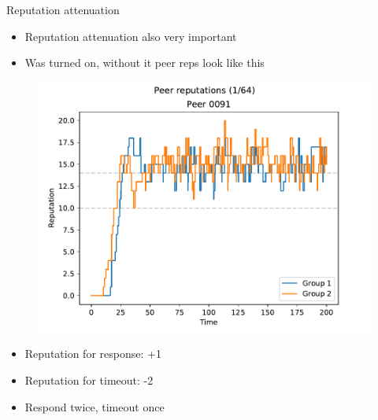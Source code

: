 \documentclass[presentation,english,usenames,dvipsnames]{beamer}
\begin{document}
\begin{frame}{Reputation attenuation}
  \begin{itemize}
    \item Reputation attenuation also very important
    \item Was turned on, without it peer reps look like this
  \end{itemize}

  \pause

  \begin{minipage}{0.5\textwidth}
    \begin{figure}
      \centering
      \includegraphics[width=1\textwidth]{figures/attenuation_no_attenuation_peer_reps_1_of_64}
    \end{figure}
  \end{minipage}%
  \begin{minipage}{0.5\textwidth}
    \begin{itemize}
      \item Reputation for response: +1
      \item Reputation for timeout: -2
      \item Respond twice, timeout once
    \end{itemize}
  \end{minipage}
\end{frame}
\end{document}
